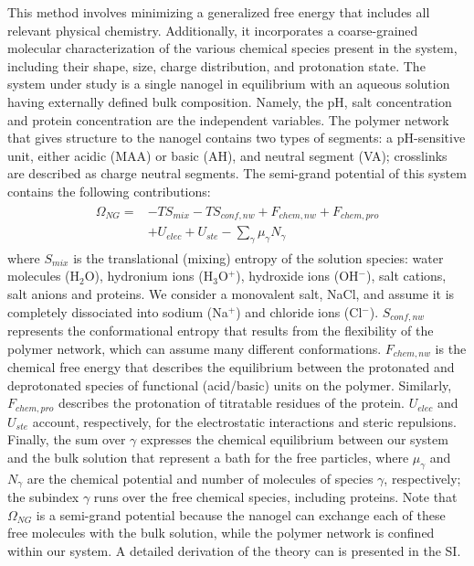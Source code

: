 This method involves minimizing a generalized free energy that includes all relevant physical chemistry.
Additionally, it incorporates a coarse-grained molecular characterization of the various chemical species present in the system, including their shape, size, charge distribution, and protonation state.
The system under study is a single nanogel in equilibrium with an aqueous solution having externally defined bulk composition.
Namely, the pH, salt concentration and protein concentration are the independent variables.
The polymer network that gives structure to the nanogel  contains two types of segments: a pH-sensitive unit, either acidic (MAA) or basic (AH), and neutral segment (VA); 
crosslinks are described as charge neutral segments.
The semi-grand potential of this system contains the following contributions:
\begin{align}
\begin{aligned}
\Omega_{NG}=& -TS_{mix} -TS_{conf,nw} + F_{chem,nw} + F_{chem,pro}\\
& + U_{elec} + U_{ste}  - {\sum_{\gamma}{\mu_\gamma N_\gamma}}
\end{aligned}
\label{eq:semicano}
\end{align}
\noindent where $S_{mix}$ is the translational (mixing) entropy of the solution species: water molecules (H$_2$O), hydronium ions (H$_3$O$^+$), hydroxide ions (OH$^-$), salt cations, salt anions and proteins.
We consider a monovalent salt, NaCl, and assume it is completely dissociated into sodium (Na$^+$) and chloride ions (Cl$^-$).
$S_{conf,nw}$ represents the conformational entropy that results from the flexibility of the polymer network, which can assume many different conformations. 
$F_{chem,nw}$ is the chemical free energy that describes the equilibrium between the protonated and deprotonated species of functional (acid/basic) units on the polymer. 
Similarly, $F_{chem,pro}$ describes the protonation of titratable residues of the protein.
$U_{elec}$ and $U_{ste}$ account, respectively, for the electrostatic interactions and steric repulsions.
Finally, the sum over $\gamma$ expresses the chemical equilibrium between our system and the bulk solution that represent a bath for the free particles, where $\mu_\gamma$ and $N_\gamma$ are the chemical potential and number of molecules of species $\gamma$, respectively;
the subindex $\gamma$ runs over the free chemical species, including proteins.
Note that $\Omega_{NG}$ is a semi-grand potential because the nanogel  can exchange each of these free molecules with the bulk solution, while the polymer network is confined within our system.
A detailed derivation of the theory can is presented in the SI.










